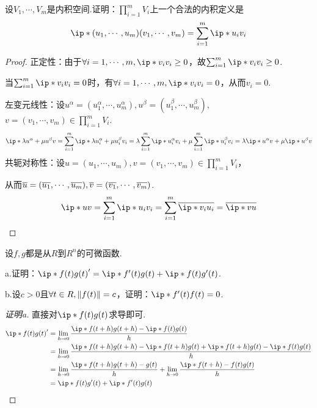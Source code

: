 \begin{problem}[23]\label{6.A.23}
    设\(V_1,\cdots,V_m\)是内积空间.证明：\(\prod_{i=1}^m V_i\)上一个合法的内积定义是
    \begin{align*}
        \ip*{(u_1,\cdots,u_m)}{(v_1,\cdots,v_m)}=\sum_{i=1}^m \ip*{u_i}{v_i}
    \end{align*}
\end{problem}

\begin{proof}
    正定性：由于\(\forall i=1,\cdots,m,\ip*{v_i}{v_i} \geq 0\)，故\(\sum_{i=1}^m \ip*{v_i}{v_i} \geq 0\).

    当\(\sum_{i=1}^m \ip*{v_i}{v_i}=0\)时，有\(\forall i=1,\cdots,m,\ip*{v_i}{v_i}=0\)，从而\(v_i=0\).
    
    左变元线性：设\(u^\alpha=(u_1^\alpha,\cdots,u_m^\alpha),u^\beta=(u_1^\beta,\cdots,u_m^\beta),\)
    \(v=(v_1,\cdots,v_m) \in \prod_{i=1}^m V_i\).
    \begin{align*}
        \ip*{\lambda u^\alpha+\mu u^\beta}{v}=\sum_{i=1}^m \ip*{\lambda u_i^\alpha+\mu u_i^\beta}{v_i}
        =\lambda \sum_{i=1}^m \ip*{u_i^\alpha}{v_i}+\mu \sum_{i=1}^m \ip*{u_i^\beta}{v_i}
        =\lambda \ip*{u^\alpha}{v}+\mu \ip*{u^\beta}{v} 
    \end{align*}
    共轭对称性：设\(u=(u_1,\cdots,u_m),v=(v_1,\cdots,v_m) \in \prod_{i=1}^m V_i\)，
    
    从而\(\ol{u}=(\ol{u_1},\cdots,\ol{u_m}),\ol{v}=(\ol{v_1},\cdots,\ol{v_m})\).
    \begin{align*}
        \ip*{u}{v}=\sum_{i=1}^m \ip*{u_i}{v_i}=\sum_{i=1}^m \ol{\ip*{v_i}{u_i}}=\ol{\ip*{v}{u}}
    \end{align*}
\end{proof}

\newpage

\begin{problem}[26]\label{6.A.26}
    设\(f,g\)都是从\(R\)到\(R^n\)的可微函数.

    a.证明：\(\ip*{f(t)}{g(t)}'=\ip*{f'(t)}{g(t)}+\ip*{f(t)}{g'(t)}\).
    
    b.设\(c>0\)且\(\forall t \in R,\norm*{f(t)}=c\)，证明：\(\ip*{f'(t)}{f(t)}=0\).
\end{problem}

\begin{proof}[证明a]
    直接对\(\ip*{f(t)}{g(t)}\)求导即可.
    \begin{align*}
        \ip*{f(t)}{g(t)}'&=\lim_{h \rightarrow 0}\dfrac{\ip*{f(t+h)}{g(t+h)}-\ip*{f(t)}{g(t)}}{h} \\
        &=\lim_{h \rightarrow 0}\dfrac{\ip*{f(t+h)}{g(t+h)}-\ip*{f(t+h)}{g(t)}+\ip*{f(t+h)}{g(t)}-\ip*{f(t)}{g(t)}}{h} \\
        &=\lim_{h \rightarrow 0}\dfrac{\ip*{f(t+h)}{g(t+h)-g(t)}}{h}+\lim_{h \rightarrow 0}\dfrac{\ip*{f(t+h)-f(t)}{g(t)}}{h} \\
        &=\ip*{f(t)}{g'(t)}+\ip*{f'(t)}{g(t)}
    \end{align*}
\end{proof}

